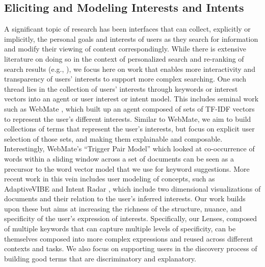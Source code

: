 \subsection{Eliciting and Modeling Interests and Intents}

A significant topic of research has been interfaces that can collect, explicitly or implicitly, the personal goals and interests of users as they search for information and modify their viewing of content correspondingly. While there is extensive literature on doing so in the context of personalized search and re-ranking of search results (e.g., \cite{speretta2005personalized,shen2005implicit,burges2005learning,cao2007learning}), we focus here on work that enables more interactivity and transparency of users' interests to support more complex searching.  One such thread lies in the collection of users' interests through keywords or interest vectors into an agent or user interest or intent model. This includes seminal work such as WebMate \cite{chen1998webmate}, which built up an agent composed of sets of TF-IDF \cite{wu2008interpreting} vectors to represent the user's different interests. Similar to WebMate, we aim to build collections of terms that represent the user's interests, but focus on explicit user selection of those sets, and making them explainable and composable. Interestingly, WebMate's ``Trigger Pair Model'' which looked at co-occurrence of words within a sliding window across a set of documents can be seen as a precursor to the word vector model that we use for keyword suggestions.  More recent work in this vein includes user modeling of concepts, such as AdaptiveVIBE \cite{ahn2009adaptive} and Intent Radar \cite{peltonen2017negative}, which include two dimensional visualizations of documents and their relation to the user's inferred interests. Our work builds upon these but aims at increasing the richness of the structure, nuance, and specificity of the user's expression of interests. Specifically, our Lenses, composed of multiple keywords that can capture multiple levels of specificity, can be themselves composed into more complex expressions and reused across different contexts and tasks. We also focus on supporting users in the discovery process of building good terms that are discriminatory and explanatory.



